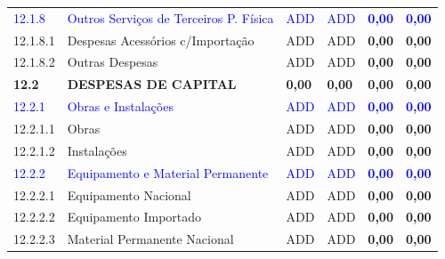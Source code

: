 \documentclass[a4paper,12pt]{article}
\begin{document}
\begin{table}[h]
{\begin{tabular}{|l|l|l|l|l|l|}
    \textcolor{blue}{12.1.8} &
    \textcolor{blue}{Outros Serviços de Terceiros P. Física} & 
    \textcolor{blue}{ADD} & 
    \textcolor{blue}{ADD} &  
    \textcolor{blue}{\textbf{0,00}} &
    \textcolor{blue}{\textbf{0,00}} \\  

    \rowcolor{Gainsboro!60} 
    12.1.8.1 & 
    Despesas Acessórios c/Importação & 
    ADD & 
    ADD & 
    \textbf{0,00} &
    \textbf{0,00} \\ 

    12.1.8.2 & 
    Outras Despesas & 
    ADD & 
    ADD &
    \textbf{0,00} &
    \textbf{0,00} \\ \hline
    
    \rowcolor{blue!40} \textbf{12.2} & 
    \textbf{DESPESAS DE CAPITAL} & 
    \textbf{0,00} & 
    \textbf{0,00} & 
    \textbf{0,00} & 
    \textbf{0,00} \\ \hline

    \rowcolor{Gainsboro!60} 
    \textcolor{blue}{12.2.1} &
    \textcolor{blue}{Obras e Instalações} & 
    \textcolor{blue}{ADD} & 
    \textcolor{blue}{ADD} &  
    \textcolor{blue}{\textbf{0,00}} &
    \textcolor{blue}{\textbf{0,00}} \\  

    12.2.1.1 & 
    Obras & 
    ADD & 
    ADD &
    \textbf{0,00} &
    \textbf{0,00} \\ 

    \rowcolor{Gainsboro!60}
    12.2.1.2 & 
    Instalações & 
    ADD & 
    ADD &
    \textbf{0,00} &
    \textbf{0,00} \\ \hline

    \textcolor{blue}{12.2.2} &
    \textcolor{blue}{Equipamento e Material Permanente} & 
    \textcolor{blue}{ADD} & 
    \textcolor{blue}{ADD} &  
    \textcolor{blue}{\textbf{0,00}} &
    \textcolor{blue}{\textbf{0,00}} \\  

    12.2.2.1 & 
    Equipamento Nacional & 
    ADD & 
    ADD &
    \textbf{0,00} &
    \textbf{0,00} \\ 
       
    \rowcolor{Gainsboro!60}
    12.2.2.2 & 
    Equipamento Importado & 
    ADD & 
    ADD &
    \textbf{0,00} &
    \textbf{0,00} \\ 

    12.2.2.3 & 
    Material Permanente Nacional & 
    ADD & 
    ADD &
    \textbf{0,00} &
    \textbf{0,00} \\ 


\end{tabular}}
\end{table}
\end{document}
